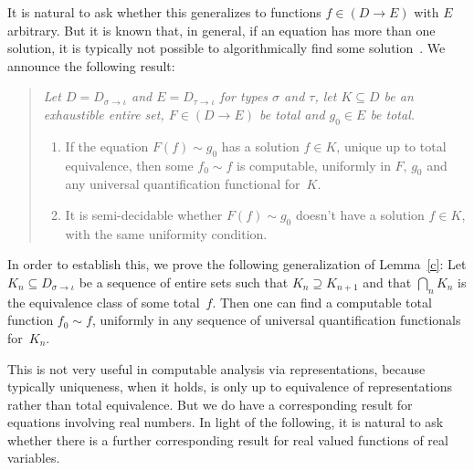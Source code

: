 \documentclass{LMCS}
\begin{document}
\pagebreak[4]
It is natural to ask whether this generalizes to functions $f \in (D
\to E)$ with $E$ arbitrary. But it is known that, in general, if an
equation has more than one solution, it is typically not possible to
algorithmically find some solution~\cite{beeson}.  We announce the
following result: \pagebreak[3]
\begin{quote} \em Let $D=D_{\sigma \to \iota}$ and $E=D_{\tau \to
    \iota}$ for types $\sigma$ and $\tau$, let $K \subseteq D$ be an
  exhaustible entire set, $F \in (D \to E)$ be total and $g_0 \in E$
  be total.
\begin{enumerate}
\item If the equation $F(f) \sim g_0$ has a solution $f \in K$, unique
  up to total equivalence, then some $f_0 \sim f$ is computable,
  uniformly in $F$, $g_0$ and any universal quantification functional
  for~$K$.
\item It is semi-decidable whether $F(f) \sim g_0$ doesn't have a
  solution $f \in K$, with the same uniformity condition.
\end{enumerate}
\end{quote}
In order to establish this, we prove the following generalization of
Lemma~\ref{c}: Let $K_n \subseteq D_{\sigma \to \iota}$ be a sequence
of entire sets such that $K_n \supseteq K_{n+1}$ and that $\bigcap_n
K_n$ is the equivalence class of some total~$f$. Then one can find a
computable total function $f_0 \sim f$, uniformly in any sequence of
universal quantification functionals for~$K_n$.

This is not very useful in computable analysis via representations,
because typically uniqueness, when it holds, is only up to
equivalence of representations rather than total equivalence. But we
do have a corresponding result for equations involving real numbers.
In light of the following, it is natural to ask whether there is a
further corresponding result for real valued functions of real
variables.
\end{document}

